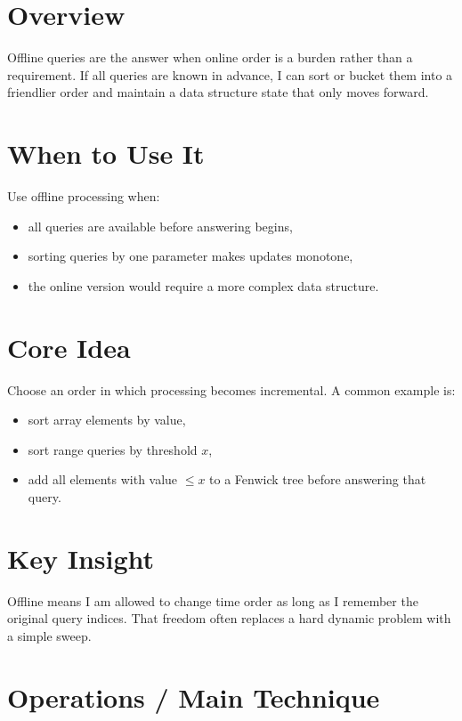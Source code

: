 \section*{Overview}

Offline queries are the answer when online order is a burden rather than a requirement. If all queries are known in
advance, I can sort or bucket them into a friendlier order and maintain a data structure state that only moves forward.

\section*{When to Use It}

Use offline processing when:

\begin{itemize}
  \item all queries are available before answering begins,
  \item sorting queries by one parameter makes updates monotone,
  \item the online version would require a more complex data structure.
\end{itemize}

\section*{Core Idea}

Choose an order in which processing becomes incremental. A common example is:

\begin{itemize}
  \item sort array elements by value,
  \item sort range queries by threshold \(x\),
  \item add all elements with value \(\le x\) to a Fenwick tree before answering that query.
\end{itemize}

\section*{Key Insight}

Offline means I am allowed to change time order as long as I remember the original query indices. That freedom often
replaces a hard dynamic problem with a simple sweep.

\section*{Operations / Main Technique}

